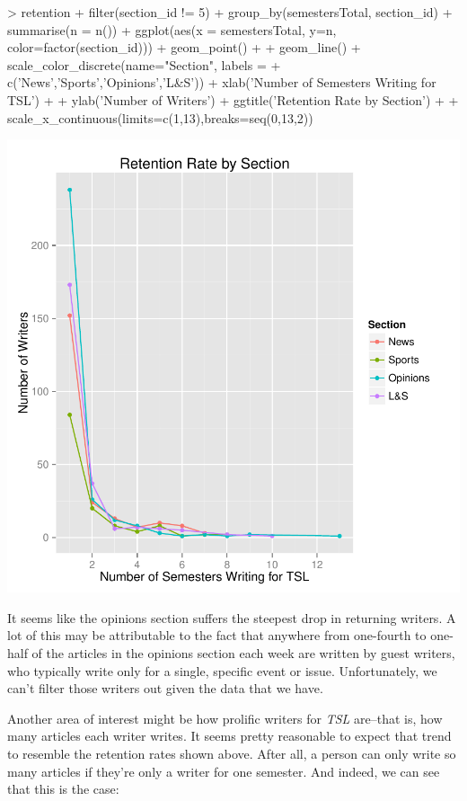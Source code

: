 \documentclass[a4paper]{article}
\begin{document}
\begin{Schunk}
\begin{Sinput}
> retention %
+   filter(section_id != 5) %
+   group_by(semestersTotal, section_id) %
+   summarise(n = n()) %
+   ggplot(aes(x = semestersTotal, y=n, color=factor(section_id))) + geom_point() +
+   geom_line() + scale_color_discrete(name="Section", labels =
+   c('News','Sports','Opinions','L&S')) + xlab('Number of Semesters Writing for TSL') +
+   ylab('Number of Writers') + ggtitle('Retention Rate by Section') +
+   scale_x_continuous(limits=c(1,13),breaks=seq(0,13,2))
\end{Sinput}
\end{Schunk}
\includegraphics{FinalProject-016}

It seems like the opinions section suffers the steepest drop in returning writers. A lot of this may be attributable to the fact that anywhere from one-fourth to one-half of the articles in the opinions section each week are written by guest writers, who typically write only for a single, specific event or issue. Unfortunately, we can't filter those writers out given the data that we have.

Another area of interest might be how prolific writers for \textit{TSL} are--that is, how many articles each writer writes. It seems pretty reasonable to expect that trend to resemble the retention rates shown above. After all, a person can only write so many articles if they're only a writer for one semester. And indeed, we can see that this is the case:
\end{document}
